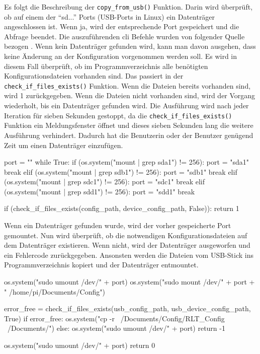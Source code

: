 Es folgt die Beschreibung der \lstinline{copy_from_usb()} Funktion. Darin wird überprüft, ob auf einem der \enquote{sd...} Ports (USB-Ports in Linux) ein Datenträger angeschlossen ist. Wenn ja, wird der entsprechende Port gespeichert und die Abfrage beendet. Die auszuführenden \acf{cli} Befehle wurden von folgender Quelle bezogen \cite[vgl.][]{Rendek:2023}. Wenn kein Datenträger gefunden wird, kann man davon ausgehen, dass keine Änderung an der Konfiguration vorgenommen werden soll. Es wird in diesem Fall überprüft, ob im Programmverzeichnis alle benötigten Konfigurationsdateien vorhanden sind. Das passiert in der \lstinline{check_if_files_exists()} Funktion. Wenn die Dateien bereits vorhanden sind, wird 1 zurückgegeben. Wenn die Dateien nicht vorhanden sind, wird der Vorgang wiederholt, bis ein Datenträger gefunden wird. Die Ausführung wird nach jeder Iteration für sieben Sekunden gestoppt, da die \lstinline{check_if_files_exists()} Funktion ein Meldungsfenster öffnet und dieses sieben Sekunden lang die weitere Ausführung verhindert. Dadurch hat die Benutzerin oder der Benutzer genügend Zeit um einen Datenträger einzufügen.

\begin{pythoncode}
	port = ""
	while True:
		if (os.system("mount | grep sda1") != 256):
			port = "sda1"
			break
		elif (os.system("mount | grep sdb1") != 256):
			port = "sdb1"
			break
		elif (os.system("mount | grep sdc1") != 256):
			port = "sdc1"
			break
		elif (os.system("mount | grep sdd1") != 256):
			port = "sdd1"
			break
		
		if (check_if_files_exists(config_path, device_config_path, False)):
			return 1
\end{pythoncode}

Wenn ein Datenträger gefunden wurde, wird der vorher gespeicherte Port gemountet. Nun wird überprüft, ob die notwendigen Konfigurationsdateien auf dem Datenträger existieren. Wenn nicht, wird der Datenträger ausgeworfen und ein Fehlercode zurückgegeben. Ansonsten werden die Dateien vom USB-Stick ins Programmverzeichnis kopiert und der Datenträger entmountet. 
\begin{pythoncode}
	os.system("sudo umount /dev/" + port)
	os.system("sudo mount /dev/" + port + " /home/pi/Documents/Config")
	
	error_free = check_if_files_exists(usb_config_path, usb_device_config_path, True)
	if error_free:
		os.system("cp -r ~/Documents/Config/RLT_Config ~/Documents/")
	else:
		os.system("sudo umount /dev/" + port)
		return -1
		
	os.system("sudo umount /dev/" + port)
	return 0
\end{pythoncode}

